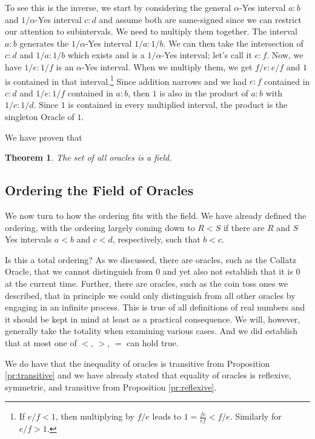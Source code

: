 \documentclass[12pt]{article}
\newtheorem{theorem}{Theorem}
\theoremstyle{remark}
\begin{document}
\begin{itemize}
    To see this is the inverse, we start by considering the general $\alpha$-Yes interval $a:b$ and $1/\alpha$-Yes interval $c:d$ and assume both are same-signed since we can restrict our attention to subintervals. We need to multiply them together. The interval $a:b$ generates the $1/\alpha$-Yes interval $1/a:1/b$. We can then take the intersection of $c:d$ and $1/a:1/b$ which exists and is a $1/\alpha$-Yes interval; let's call it $e:f$. Now, we have $1/e:1/f$ is an $\alpha$-Yes interval. When we multiply them, we get $f/e:e/f$ and $1$ is  contained in that interval.\footnote{If $e/f <1$, then multiplying by $f/e$ leads to $1 = \frac{fe}{ef} < f/e$. Similarly for $e/f > 1$.} Since addition narrows and we had $e:f$ contained in $c:d$ and $1/e:1/f$ contained in $a:b$, then $1$ is also in the product of $a:b$ with $1/c:1/d$. Since $1$ is contained in every multiplied interval, the product is the singleton Oracle of $1$. 
    
\end{itemize}

We have proven that

\begin{theorem}
The set of all oracles is a field. 
\end{theorem}

\subsection{Ordering the Field of Oracles}

We now turn to how the ordering fits with the field. We have already defined the ordering, with the ordering largely coming down to $R < S$ if there are $R$ and $S$ Yes intervals $a<b$ and $c<d$, respectively, such that $b<c$. 

Is this a total ordering? As we discussed, there are oracles, such as the Collatz Oracle, that we cannot distinguish from 0 and yet also not establish that it is 0 at the current time. Further, there are oracles, such as the coin toss ones we described, that in principle we could only distinguish from all other oracles by engaging in an infinite process. This is true of all definitions of real numbers and it should be kept in mind at least as a practical consequence. We will, however, generally take the totality when examining various cases. And we did establish that at most one of $<$, $>$, $=$ can hold true. 

We do have that the inequality of oracles is transitive from Proposition \ref{pr:transitive} and we have already stated that equality of oracles is reflexive, symmetric, and transitive from Proposition \ref{pr:reflexive}. 
\end{document}
